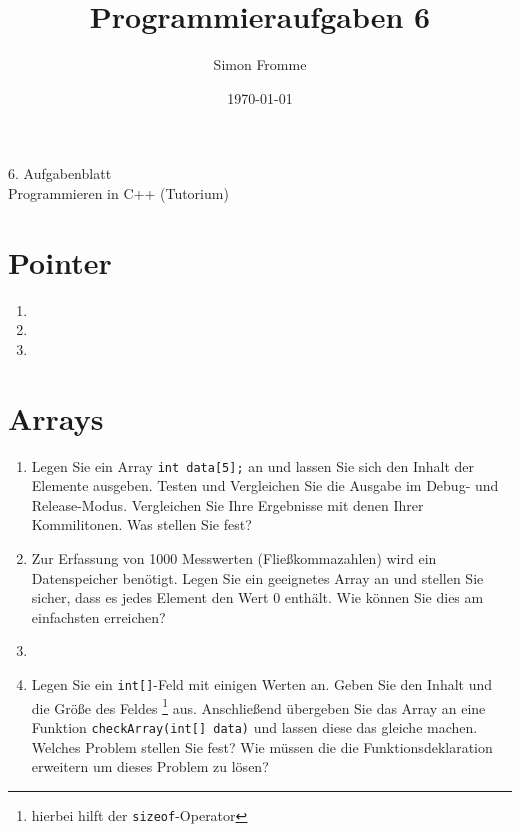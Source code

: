 \documentclass[paper=a4, fontsize=11pt, twoside]{scrartcl}
\title{Programmieraufgaben 6}
\author{Simon Fromme}
\date{\normalsize\today}
\begin{document}
\vspace*{0.75\baselineskip}
\begin{center}
  \Large 6. Aufgabenblatt \\\vspace{0.5em} \large Programmieren in C++ (Tutorium)
\end{center}

\section*{Pointer}
\begin{enumerate}
  \item 
  \item 
  \item 
\end{enumerate}

\section*{Arrays}
\begin{enumerate}
  \item Legen Sie ein Array \texttt{int data[5];} an und lassen Sie sich den Inhalt der Elemente ausgeben. Testen und Vergleichen Sie die Ausgabe im Debug- und Release-Modus. Vergleichen Sie Ihre Ergebnisse mit denen Ihrer Kommilitonen. Was stellen Sie fest?
  \item Zur Erfassung von 1000 Messwerten (Fließkommazahlen) wird ein Datenspeicher benötigt. Legen Sie ein geeignetes Array an und stellen Sie sicher, dass es jedes Element den Wert 0 enthält. Wie können Sie dies am einfachsten erreichen?
  \item 
  \item Legen Sie ein \texttt{int[]}-Feld mit einigen Werten an. Geben Sie den Inhalt und die Größe des Feldes \footnote{hierbei hilft der \texttt{sizeof}-Operator} aus. Anschließend übergeben Sie das Array an eine Funktion \texttt{checkArray(int[] data)} und lassen diese das gleiche machen. Welches Problem stellen Sie fest? Wie müssen die die Funktionsdeklaration erweitern um dieses Problem zu lösen?
\end{enumerate}
\end{document}
